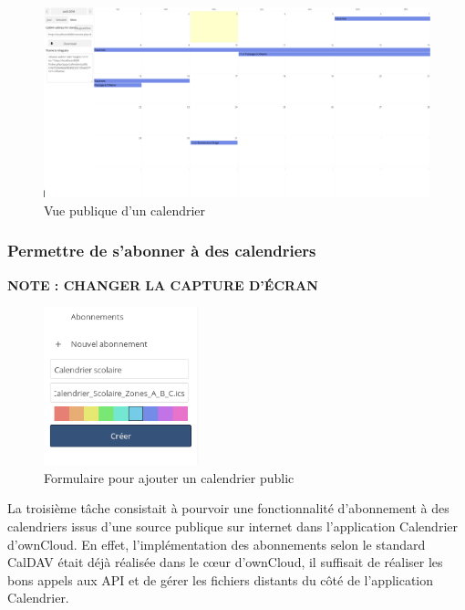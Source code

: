 \documentclass[10pt,a4paper, twoside]{report}
\begin{document}
	\begin{figure}[ht]
		\centering
		\centerline{\includegraphics[width=1.5\textwidth]{images/calendrier-vue-publique.png}}
		\caption*{Vue publique d'un calendrier}
		\label{normal_case}
	\end{figure}
	
	
	\subsubsection{Permettre de s'abonner à des calendriers}
	
	\textbf{\color{red}NOTE : CHANGER LA CAPTURE D'ÉCRAN}
	\begin{figure}
		\begin{center}
			\includegraphics[width=0.40\textwidth]{images/creation_abonnement.png}
		\end{center}
		\caption*{Formulaire pour ajouter un calendrier public}
	\end{figure}
	
	La troisième tâche consistait à pourvoir une fonctionnalité d'abonnement à des calendriers issus d'une source publique sur internet dans l'application Calendrier d'ownCloud. En effet, l'implémentation des abonnements selon le standard CalDAV était déjà réalisée dans le cœur d'ownCloud, il suffisait de réaliser les bons appels aux API et de gérer les fichiers distants du côté de l'application Calendrier.
	
\end{document}
